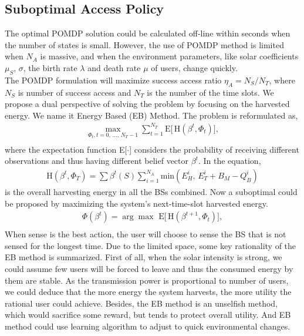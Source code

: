 \documentclass[conference]{IEEEtran}
\begin{document}
\subsection{Suboptimal Access Policy}
The optimal POMDP solution could be calculated off-line within seconds when the number of states is small.
However, the use of POMDP method is limited when \(N_A\) is massive,
and when the environment parameters, like solar coefficients \(\mu_S\), \(\sigma\),
the birth rate \(\lambda\) and death rate \(\mu\) of users, change quickly.\\
The POMDP formulation will maximize success access ratio \(\eta_A = N_S/N_T\),
where \(N_S\) is number of success access and \(N_T\) is the number of the time slots.
We propose a dual perspective of solving the problem by focusing on the harvested energy.
We name it Energy Based (EB) Method.
The problem is reformulated as,
\begin{equation}
\begin{aligned}
	\underset{\Phi_t,t=0,\,\ldots,\,N_T-1}{\max}\sum\nolimits_{t=1}^{N_T}
	\mbox{E}\big[\,\mbox{H}\left(\beta^t, \Phi_t\right)\big],\\
\end{aligned}
\end{equation}
where the expectation function E[\(\cdot\)] considers the probability of receiving different observations 
and thus having different belief vector \(\beta^t\).
In the equation,
\begin{equation}
\begin{aligned}
	\mbox{H}\left(\beta^t, \Phi_T\right) = \sum\beta^t\left(S\right)\sum_{i=1}^{N_A}
	\mbox{min}\left(E_H^i,\,E_T^i+B_M-Q_B^i\right)
\end{aligned}
\end{equation}
is the overall harvesting energy in all the BSs combined.
Now a suboptimal could be proposed by maximizing the system's next-time-slot harvested energy.
\begin{equation}
\begin{aligned}
	\Phi\left(\beta^t\right) = \arg{\max}\,\,\mbox{E}\big\lbrack\,\mbox{H}(\beta^{t+1}, \Phi_t)\big\rbrack,\\
\end{aligned}
\end{equation}
When sense is the best action, the user will choose to sense the BS that is not sensed for the longest time.
Due to the limited space, some key rationality of the EB method is summarized.
First of all, when the solar intensity is strong,
we could assume few users will be forced to leave and thus the consumed energy by them are stable.
As the transmission power is proportional to number of users,
we could deduce that the more energy the system harvests,
the more utility the rational user could achieve.
Besides, the EB method is an unselfish method, which would sacrifice some reward,
but tends to protect overall utility.
And EB method could use learning algorithm to adjust to quick environmental changes.
\end{document}
